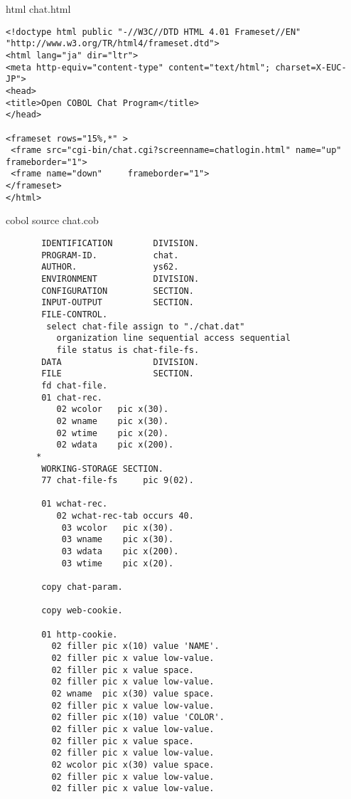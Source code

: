 {\gt html} chat.html

{\footnotesize 
\begin{verbatim}
<!doctype html public "-//W3C//DTD HTML 4.01 Frameset//EN" "http://www.w3.org/TR/html4/frameset.dtd">
<html lang="ja" dir="ltr">
<meta http-equiv="content-type" content="text/html"; charset=X-EUC-JP">
<head>
<title>Open COBOL Chat Program</title>
</head>

<frameset rows="15%,*" >
 <frame src="cgi-bin/chat.cgi?screenname=chatlogin.html" name="up" frameborder="1">
 <frame name="down"     frameborder="1">
</frameset>
</html>
\end{verbatim}

\vspace{1em}
{\gt cobol source} chat.cob

{\footnotesize
\begin{verbatim}
       IDENTIFICATION        DIVISION.
       PROGRAM-ID.           chat.
       AUTHOR.               ys62.
       ENVIRONMENT           DIVISION.
       CONFIGURATION         SECTION.
       INPUT-OUTPUT          SECTION.
       FILE-CONTROL.
        select chat-file assign to "./chat.dat"
          organization line sequential access sequential
          file status is chat-file-fs.
       DATA                  DIVISION.
       FILE                  SECTION.
       fd chat-file.
       01 chat-rec.
          02 wcolor   pic x(30).
          02 wname    pic x(30).
          02 wtime    pic x(20).
          02 wdata    pic x(200).
      *
       WORKING-STORAGE SECTION.
       77 chat-file-fs     pic 9(02).

       01 wchat-rec.
          02 wchat-rec-tab occurs 40.
           03 wcolor   pic x(30).
           03 wname    pic x(30).
           03 wdata    pic x(200).
           03 wtime    pic x(20).
         
       copy chat-param.

       copy web-cookie.

       01 http-cookie.
         02 filler pic x(10) value 'NAME'.
         02 filler pic x value low-value.
         02 filler pic x value space.
         02 filler pic x value low-value.
         02 wname  pic x(30) value space.
         02 filler pic x value low-value.
         02 filler pic x(10) value 'COLOR'.
         02 filler pic x value low-value.
         02 filler pic x value space.
         02 filler pic x value low-value.
         02 wcolor pic x(30) value space.
         02 filler pic x value low-value.
         02 filler pic x value low-value.
      

\end{verbatim}}}
